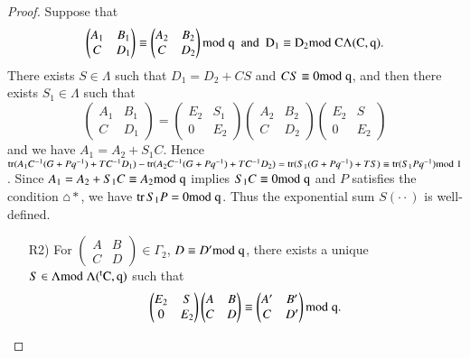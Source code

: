 \begin{proof}
Suppose that
$$
\begin{pmatrix}
A_{1} & B_{1}\\
C & D_{1}
\end{pmatrix}
\equiv
\begin{pmatrix}
A_{2} & B_{2}\\
C & D_{2}
\end{pmatrix}
\rm{mod} \; q\text{ \  and \ } D_{1}\equiv D_{2}\rm{mod} \; C\Lambda(C,q).
$$
There exists $S\in\Lambda$ such that $D_{1}=D_{2}+CS$ and $CS\equiv
0\rm{mod} \; q$, and then there exists $S_{1}\in\Lambda$ such that
$$
\begin{pmatrix}
A_{1} & B_{1}\\
C & D_{1}
\end{pmatrix}
=
\begin{pmatrix}
E_{2} & S_{1}\\
0 & E_{2}
\end{pmatrix}
\begin{pmatrix}
A_{2} & B_{2}\\
C & D_{2}
\end{pmatrix}
\begin{pmatrix}
E_{2} & S\\
0 & E_{2}
\end{pmatrix}
$$
and we have $A_{1}=A_{2}+S_{1}C$. Hence
$\tr(A_{1}C^{-1}(G+Pq^{-1})+TC^{-1}D_{1})-
\tr(A_{2}C^{-1}(G+Pq^{-1})+TC^{-1}D_{2})=\tr(S_{1}(G+Pq^{-1})+TS)\equiv
\tr(S_{1}Pq^{-1})\break\rm{mod} \; 1$. Since $A_{1}=A_{2}+S_{1}C\equiv A_{2}\rm{mod} \; q$
implies $S_{1}C\equiv 0\rm{mod} \; q$ and $P$ satisfies the condition
$\house{\ast}$, we have $\operatorname{tr} S_{1}P=0\rm{mod} \; q$. Thus the
exponential sum $S(\cdot\cdot)$ is well-defined.
\begin{itemize}
\item[R2)] For $\left(\begin{smallmatrix} A & B\\ C & D
\end{smallmatrix}\right)\in\Gamma_{2}$, $D\equiv D'\rm{mod} \; q$, there
  exists a unique $S\in \Lambda\break\rm{mod} \; \Lambda ({}^{t}C,q)$ such that
$$
\begin{pmatrix}
E_{2} & S\\
0 & E_{2}
\end{pmatrix}
\begin{pmatrix}
A & B\\
C & D
\end{pmatrix}
\equiv 
\begin{pmatrix}
A' & B'\\
C & D'
\end{pmatrix}
\rm{mod} \; q.
$$
\end{itemize}
\end{proof}

